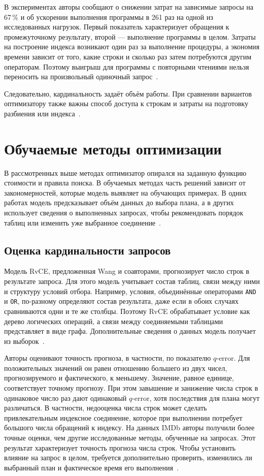 \documentclass[a4paper, final]{article}
\begin{document}
	В экспериментах авторы сообщают о снижении затрат на зависимые запросы на 67\,\% и об ускорении выполнения программы в 261 раз на одной из исследованных нагрузок. Первый показатель характеризует обращения к промежуточному результату, второй --- выполнение программы в целом. Затраты на построение индекса возникают один раз за выполнение процедуры, а экономия времени зависит от того, какие строки и сколько раз затем потребуются другим операторам. Поэтому выигрыш для программы с повторными чтениями нельзя переносить на произвольный одиночный запрос~\cite{rahman2026}.
	
	Следовательно, кардинальность задаёт объём работы. При сравнении вариантов оптимизатору также важны способ доступа к строкам и затраты на подготовку разбиения или индекса~\cite{manegold2000,rahman2026}.
	
	\newpage
	\section{Обучаемые методы оптимизации}
	
	В рассмотренных выше методах оптимизатор опирался на заданную функцию стоимости и правила поиска. В обучаемых методах часть решений зависит от закономерностей, которые модель выявляет на обучающих примерах. В одних работах модель предсказывает объём данных до выбора плана, а в других использует сведения о выполненных запросах, чтобы рекомендовать порядок таблиц или изменить уже выбранное соединение~\cite{wang2024,autoquo2024,foss2024}.
	
	\subsection{Оценка кардинальности запросов}
	
	Модель RvCE, предложенная Wang и соавторами, прогнозирует число строк в результате запроса. Для этого модель учитывает состав таблиц, связи между ними и структуру условий отбора. Например, условия, объединённые операторами \texttt{AND} и \texttt{OR}, по-разному определяют состав результата, даже если в обоих случаях сравниваются одни и те же столбцы. Поэтому RvCE обрабатывает условие как дерево логических операций, а связи между соединяемыми таблицами представляет в виде графа. Дополнительные сведения о данных модель получает из выборок~\cite{wang2024}.
	
	Авторы оценивают точность прогноза, в частности, по показателю $q$-error. Для положительных значений он равен отношению большего из двух чисел, прогнозируемого и фактического, к меньшему. Значение, равное единице, соответствует точному прогнозу. При этом завышение и занижение числа строк в одинаковое число раз дают одинаковый $q$-error, хотя последствия для плана могут различаться. В частности, недооценка числа строк может сделать привлекательным индексное соединение, которое при выполнении потребует большого числа обращений к индексу. На данных IMDb авторы получили более точные оценки, чем другие исследованные методы, обученные на запросах. Этот результат характеризует точность прогноза числа строк. Чтобы установить влияние на запрос в целом, требуется дополнительно проверить, изменились ли выбранный план и фактическое время его выполнения~\cite{wang2024,leis2015}.
	
\end{document}

